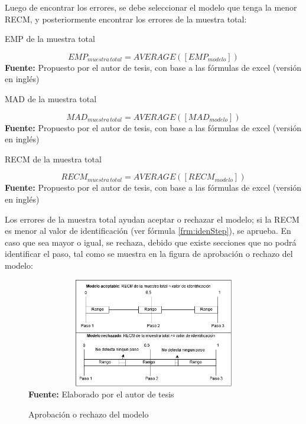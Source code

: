 Luego de encontrar los errores, se debe seleccionar el modelo que tenga la menor \acrshort{RECM}, y posteriormente encontrar los errores de la muestra total:
 \begin{formula}[H]
	\centering
	\caption{EMP de la muestra total}
	\label{frm:EmpAll}
	\begin{equation}
EMP_{muestra\, total}=AVERAGE([EMP_{modelo}])
	\end{equation}
	\textbf{Fuente:} Propuesto por el autor de tesis, con base a las f\'ormulas de excel (versi\'on en ingl\'es)
\end{formula}  
 \begin{formula}[H]
	\centering
	\caption{MAD de la muestra total}
	\label{frm:MadAll}
	\begin{equation}
MAD_{muestra\, total}=AVERAGE([MAD_{modelo}])
	\end{equation}
	\textbf{Fuente:} Propuesto por el autor de tesis, con base a las f\'ormulas de excel (versi\'on en ingl\'es)
\end{formula}  
	 \begin{formula}[H]
	\centering
	\caption{RECM de la muestra total}
	\label{frm:RecmAll}
	\begin{equation}
RECM_{muestra\, total}=AVERAGE([RECM_{modelo}])
	\end{equation}
	\textbf{Fuente:} Propuesto por el autor de tesis, con base a las f\'ormulas de excel (versi\'on en ingl\'es)
\end{formula} 
Los errores de la muestra total ayudan aceptar o rechazar el modelo; si la \acrshort{RECM} es menor al valor de identificaci\'on (ver f\'ormula \ref{frm:idenStep}), se aprueba. En caso que sea mayor o igual, se rechaza, debido que existe secciones que no podr\'a identificar el paso, tal como se muestra en la figura de aprobaci\'on o rechazo del modelo:
\begin{figure}[H]
	\caption{Aprobaci\'on o rechazo del modelo}
	\label{fig:AproveOrDennie}
	\centering
	\includegraphics[width=430px,height=180px]{graphics/aceptacionModelo.png} \\
	\textbf{Fuente:} Elaborado por el autor de tesis
\end{figure}
